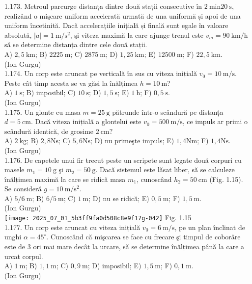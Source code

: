 1.173. Metroul parcurge distanța dintre două stații consecutive în $2 \mathrm{~min} 20 \mathrm{~s}$, realizând o mişcare uniform accelerată urmată de una uniformă și apoi de una uniform încetinită. Dacă accelerațiile inițială și finală sunt egale în valoare absolută, $|a|=1 \mathrm{~m} / \mathrm{s}^{2}$, şi viteza maximă la care ajunge trenul este $v_{m}=90 \mathrm{~km} / \mathrm{h}$ să se determine distanța dintre cele două stații.\\ A) $2,5 \mathrm{~km}$; B) $2225 \mathrm{~m}$; C) $2875 \mathrm{~m}$; D) $1,25 \mathrm{~km}$; E) $12500 \mathrm{~m}$; F) $22,5 \mathrm{~km}$.\\ (Ion Gurgu)\\

1.174. Un corp este aruncat pe verticală în sus cu viteza inițială $v_{0}=10 \mathrm{~m} / \mathrm{s}$. Peste cât timp acesta se va găsi la înălțimea $h=10 \mathrm{~m}$?\\ A) $1 \mathrm{~s}$; B) imposibil; C) $10 \mathrm{~s}$; D) $1,5 \mathrm{~s}$; E) $1 \mathrm{~h}$; F) $0,5 \mathrm{~s}$.\\ (Ion Gurgu)\\

1.175. Un glonte cu masa $m=25 \mathrm{~g}$ pătrunde într-o scândură pe distanța $d=5 \mathrm{~cm}$. Dacă viteza inițială a glontelui este $v_{0}=500 \mathrm{~m} / \mathrm{s}$, ce impuls ar primi o scândură identică, de grosime $2 \mathrm{~cm}?$\\ A) $2 \mathrm{~kg}$; B) $2,8 \mathrm{Ns}$; C) $5,6 \mathrm{Ns}$; D) nu primeşte impuls; E) $1,4 \mathrm{Nm}$; F) $1,4 \mathrm{Ns}$.\\ (Ion Gurgu)\\

1.176. De capetele unui fir trecut peste un scripete sunt legate două corpuri cu masele $m_{1}=10 \mathrm{~g}$ şi $m_{2}=50 \mathrm{~g}$. Dacă sistemul este lăsat liber, să se calculeze înălțimea maximă la care se ridică masa $m_{1}$, cunoscând $h_{2}=50 \mathrm{~cm}$ (Fig. 1.15). Se consideră $g=10 \mathrm{~m} / \mathrm{s}^{2}$.\\ A) $5 / 6 \mathrm{~m}$; B) $6 / 5 \mathrm{~m}$; C) $1 \mathrm{~m}$; D) nu se ridică; E) $0,5 \mathrm{~m}$; F) $1,5 \mathrm{~m}$.\\ (Ion Gurgu)\\ \texttt{[image: 2025\_07\_01\_5b3ff9fa0d508c8e9f17g-042]} Fig. 1.15\\

1.177. Un corp este aruncat cu viteza inițială $v_{0}=6 \mathrm{~m} / \mathrm{s}$, pe un plan înclinat de unghi $\alpha=45^{\circ}$. Cunoscând că mişcarea se face cu frecare şi timpul de coborâre este de 3 ori mai mare decât la urcare, să se determine înălțimea până la care a urcat corpul.\\ A) $1 \mathrm{~m}$; B) $1,1 \mathrm{~m}$; C) $0,9 \mathrm{~m}$; D) imposibil; E) $1,5 \mathrm{~m}$; F) $0,1 \mathrm{~m}$.\\ (Ion Gurgu)\\

